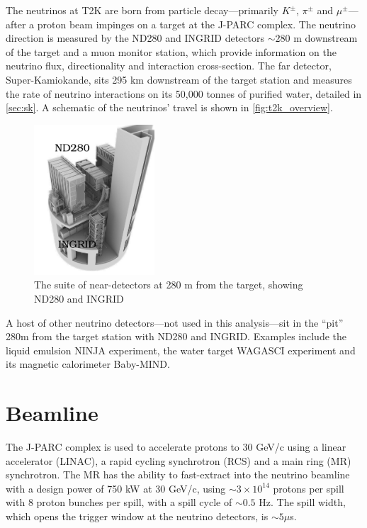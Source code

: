 The neutrinos at T2K are born from particle decay---primarily $K^\pm$, $\pi^\pm$ and $\mu^\pm$---after a proton beam impinges on a target at the J-PARC complex. The neutrino direction is measured by the ND280 and INGRID detectors $\sim280$ m downstream of the target and a muon monitor station, which provide information on the neutrino flux, directionality and interaction cross-section. The far detector, Super-Kamiokande, sits 295 km downstream of the target station and measures the rate of neutrino interactions on its 50,000 tonnes of purified water, detailed in \autoref{sec:sk}. A schematic of the neutrinos' travel is shown in \autoref{fig:t2k_overview}.
\begin{figure}[h]
	\includegraphics[width=0.4\textwidth, trim={10mm 0mm 0mm 0mm}, clip,page=1]{figures/det_chap/view/image_nd.jpeg}
	\caption{The suite of near-detectors at 280 m from the target, showing ND280 and INGRID}
\end{figure}

A host of other neutrino detectors---not used in this analysis---sit in the ``pit'' 280m from the target station with ND280 and INGRID. Examples include the liquid emulsion NINJA experiment\cite{ninja}, the water target WAGASCI\cite{wagasci} experiment and its magnetic calorimeter Baby-MIND\cite{baby_mind}.

\section{Beamline}
The J-PARC complex\cite{jparc_tdr} is used to accelerate protons to 30 GeV/c using a linear accelerator (LINAC), a rapid cycling synchrotron (RCS) and a main ring (MR) synchrotron. The MR has the ability to fast-extract into the neutrino beamline with a design power of 750 kW at 30 GeV/c, using $\sim3\times10^{14}$ protons per spill with 8 proton bunches per spill, with a spill cycle of $\sim0.5$ Hz. The spill width, which opens the trigger window at the neutrino detectors, is $\sim5 \mu$s\cite{t2k_det}.

